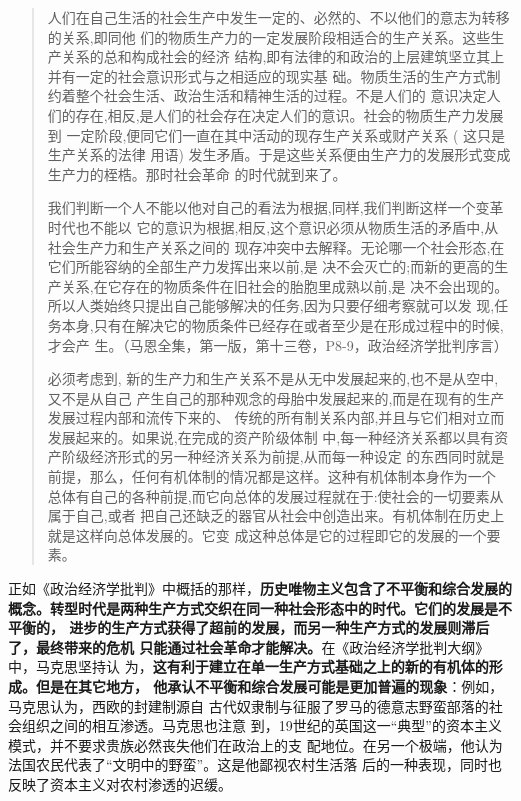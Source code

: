 \begin{quotation}
  人们在自己生活的社会生产中发生一定的、必然的、不以他们的意志为转移的关系,即同他
  们的物质生产力的一定发展阶段相适合的生产关系。这些生产关系的总和构成社会的经济
  结构,即有法律的和政治的上层建筑坚立其上并有一定的社会意识形式与之相适应的现实基
  础。物质生活的生产方式制约着整个社会生活、政治生活和精神生活的过程。不是人们的
  意识决定人们的存在,相反,是人们的社会存在决定人们的意识。社会的物质生产力发展到
  一定阶段,便同它们一直在其中活动的现存生产关系或财产关系 ( 这只是生产关系的法律
  用语) 发生矛盾。于是这些关系便由生产力的发展形式变成生产力的桎梏。那时社会革命
  的时代就到来了。

  我们判断一个人不能以他对自己的看法为根据,同样,我们判断这样一个变革时代也不能以
  它的意识为根据,相反,这个意识必须从物质生活的矛盾中,从社会生产力和生产关系之间的
  现存冲突中去解释。无论哪一个社会形态,在它们所能容纳的全部生产力发挥出来以前,是
  决不会灭亡的;而新的更高的生产关系,在它存在的物质条件在旧社会的胎胞里成熟以前,是
  决不会出现的。所以人类始终只提出自己能够解决的任务,因为只要仔细考察就可以发
  现,任务本身,只有在解决它的物质条件已经存在或者至少是在形成过程中的时候,才会产
  生。（马恩全集，第一版，第十三卷，P8-9，政治经济学批判序言）

  
  必须考虑到, 新的生产力和生产关系不是从无中发展起来的,也不是从空中,又不是从自己
  产生自己的那种观念的母胎中发展起来的,而是在现有的生产发展过程内部和流传下来的、
  传统的所有制关系内部,并且与它们相对立而发展起来的。如果说,在完成的资产阶级体制
  中,每一种经济关系都以具有资产阶级经济形式的另一种经济关系为前提,从而每一种设定
  的东西同时就是前提，那么，任何有机体制的情况都是这样。这种有机体制本身作为一个
  总体有自己的各种前提,而它向总体的发展过程就在于:使社会的一切要素从属于自己,或者
  把自己还缺乏的器官从社会中创造出来。有机体制在历史上就是这样向总体发展的。它变
  成这种总体是它的过程即它的发展的一个要素。 
  
\end{quotation}

正如《政治经济学批判》中概括的那样，\textbf{历史唯物主义包含了不平衡和综合发展的
  概念。转型时代是两种生产方式交织在同一种社会形态中的时代。它们的发展是不平衡的，
  进步的生产方式获得了超前的发展，而另一种生产方式的发展则滞后了，最终带来的危机
  只能通过社会革命才能解决。}在《政治经济学批判大纲》中，马克思坚持认
为，\textbf{这有利于建立在单一生产方式基础之上的新的有机体的形成。但是在其它地方，
  他承认不平衡和综合发展可能是更加普遍的现象}：例如，马克思认为，西欧的封建制源自
古代奴隶制与征服了罗马的德意志野蛮部落的社会组织之间的相互渗透。马克思也注意
到，19世纪的英国这一“典型”的资本主义模式，并不要求贵族必然丧失他们在政治上的支
配地位。在另一个极端，他认为法国农民代表了“文明中的野蛮”。这是他鄙视农村生活落
后的一种表现，同时也反映了资本主义对农村渗透的迟缓。

